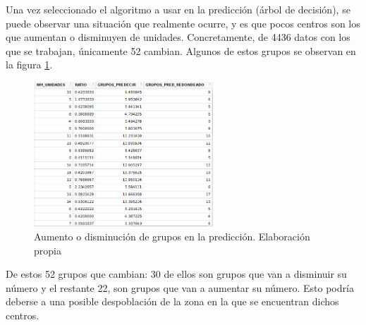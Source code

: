 

Una vez seleccionado el algoritmo a usar en la predicción (árbol de decisión), se puede observar una situación que realmente ocurre, y es que pocos centros son los que aumentan o disminuyen de unidades. Concretamente, de 4436 datos con los que se trabajan, únicamente 52 cambian. Algunos de estos grupos se observan en la figura \ref{fig:UnidadesDistintasPrediccion}.

\begin{figure}[htb]
	\centering
	\caption{Aumento o disminución de grupos en la predicción. Elaboración propia}
	\label{fig:UnidadesDistintasPrediccion}
	\includegraphics[width=0.6\textwidth]{recursos/ImagenesR/UnidadesDistintasPrediccion}
\end{figure}
\FloatBarrier

De estos 52 grupos que cambian: 30 de ellos son grupos que van a disminuir su número y el restante 22, son grupos que van a aumentar su número. Esto podría deberse a una posible despoblación de la zona en la que se encuentran dichos centros.





